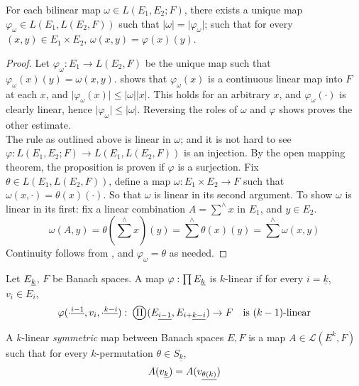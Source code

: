 \documentclass[../main-manifolds.tex]{subfiles}
\begin{document}
\begin{wts}[$L(E_1,E_2;F)$ is isomorphic to $L(E_1, L(E_2,F))$]\label{prop:bilinear-map-isomorphism-currying}
    For each bilinear map $\omega\in L(E_1,E_2;F)$, there exists a unique map $\varphi_\omega\in L(E_1, L(E_2,F))$ such that $\vert \omega\vert = \vert\varphi_\omega\vert$; such that for every $(x,y)\in E_1\times E_2$, $\omega(x,y) = \varphi(x)(y)$.
\end{wts}
\begin{proof}
    Let $\varphi_\omega: E_1\to L(E_2,F)$ be the unique map such that $\varphi_\omega(x)(y) = \omega(x,y)$.  shows that $\varphi_\omega(x)$ is a continuous linear map into $F$ at each $x$, and $\vert\varphi_\omega(x)\vert\leq\vert\omega\vert\vert x\vert$. This holds for an arbitrary $x$, and $\varphi_{\omega}(\cdot)$ is clearly linear, hence $\vert\varphi_\omega\vert\leq\vert\omega\vert$. Reversing the roles of $\omega$ and $\varphi$ shows proves the other estimate.\\

    The rule as outlined above is linear in $\omega$; and it is not hard to see $\varphi: L(E_1,E_2; F)\to L(E_1, L(E_2, F))$ is an injection. By the open mapping theorem, the proposition is proven if $\varphi$ is a surjection. Fix $\theta\in L(E_1, L(E_2,F))$, define a map $\omega: E_1\times E_2\to F$ such that $\omega(x,\cdot) = \theta(x)(\cdot)$. So that $\omega$ is linear in its second argument. To show $\omega$ is linear in its first: fix a linear combination $A = \sum^\wedge x$ in $E_1$, and $y\in E_2$. 
    \[
    \omega(A,y) =\theta(\sum^\wedge x)(y) = \sum^\wedge \theta(x)(y) = \sum^\wedge \omega(x,y)
    \]
    Continuity follows from , and $\varphi_\omega = \theta$ as needed.
\end{proof}

\begin{definition}\label{def:k-linear-maps}
    Let $\UL{E}[k]$, $F$ be Banach spaces. A map $\varphi: \prod \UL{E}[k]$ is $k$-linear if for every $i=\underline{k}$, $v_i\in E_i$, 
    \[
        \varphi(\UPL{\cdot}[i-1],v_i,\UPL{\cdot}[k-i]):\: \bigoprod (\UL{E}[i-1],\UL{E}[i+][k-i])\to F\quad\text{is }(k-1)\text{-linear}
    \]
\end{definition}
A $k$-linear \emph{symmetric} map between Banach spaces $E,F$ is a map $A\in \mathcal{L}(E^k,F)$ such that for every $k$-permutation $\theta\in S_{\underline{k}}$, 
\[
    A(\Ul{v}[k]) = A(\Ul{v}[\theta(k)])    
\]
\end{document}
